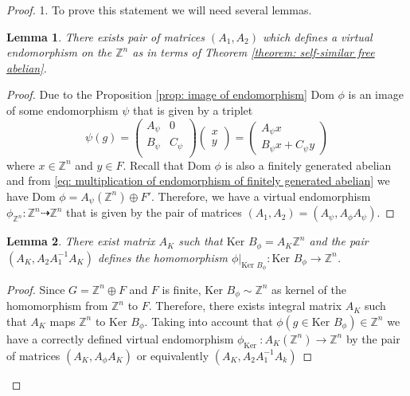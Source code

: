 \documentclass[a4paper,12pt]{amsart}
\newtheorem{lemma}{Lemma}
\theoremstyle{definition}
\newcommand{\Dom}{\text{Dom }}
\newcommand{\Ker}{\text{Ker }}
\begin{document}
	\begin{proof}
		
		1. To prove this statement we will need several lemmas. 
		
		\begin{lemma}
			There exists pair of matrices $(A_1, A_2)$ which defines a virtual endomorphism on the $\mathbb{Z}^n$ as in terms of Theorem \ref{theorem: self-similar free abelian}.
		\end{lemma}
		
		\begin{proof}
		
		Due to the Proposition \ref{prop: image of endomorphism} $\Dom \phi$ is an image of some endomorphism $\psi$ that is given by a triplet 
		\begin{equation} \label{eq: multiplication of endomorphism of finitely generated abelian}
			\psi(g) =
			\begin{pmatrix}
				A_\psi & 0 \\
				B_\psi & C_\psi \\
			\end{pmatrix}
			\begin{pmatrix}
				x \\ 
				y 
			\end{pmatrix}
			= \begin{pmatrix}
				A_\psi x \\ 
				B_\psi x + C_\psi y
			\end{pmatrix}
		\end{equation}
		where $x \in \mathbb{Z}^n$ and $y \in F$. Recall that $\Dom \phi$ is also a finitely generated abelian and from \ref{eq: multiplication of endomorphism of finitely generated abelian} we have $\Dom \phi = A_{\psi}(\mathbb{Z}^n) \oplus F'$. Therefore, we have a virtual endomorphism $\phi_{\mathbb{Z}^n} : \mathbb{Z}^n \dashrightarrow \mathbb{Z}^n$ that is given by the pair of matrices $(A_1, A_2) = (A_\psi, A_{\phi} A_{\psi})$.
			
		\end{proof}

	 	\begin{lemma}
			There exist matrix $A_K$ such that $\Ker B_\phi = A_K \mathbb{Z}^n$ and the pair $(A_K, A_2 A_1^{-1} A_K)$ defines the homomorphism $\phi|_{\Ker B_\phi} : \Ker B_\phi \rightarrow \mathbb{Z}^n$.			
		\end{lemma}
		
		\begin{proof}
			Since $G = \mathbb{Z}^n \oplus F$ and $F$ is finite, $\Ker B_\phi \sim \mathbb{Z}^n$ as kernel of the homomorphism from $\mathbb{Z}^n$ to $F$. Therefore, there exists integral matrix $A_K$ such that $A_K$ maps $\mathbb{Z}^n$ to $\Ker B_\phi$. Taking into account that $\phi(g \in \Ker B_\phi) \in \mathbb{Z}^n$ we have a correctly defined virtual endomorphism $\phi_{\Ker} : A_K(\mathbb{Z}^n) \rightarrow \mathbb{Z}^n$ by the pair of matrices $(A_K, A_\phi A_K)$ or equivalently $(A_K, A_2A_1^{-1}A_k)$	
		\end{proof}
		

\end{proof}
\end{document}
